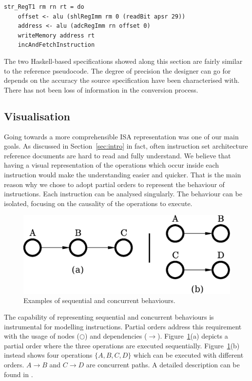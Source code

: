 \documentclass[conference]{IEEEtran}
\begin{document}
\begin{lstlisting}[caption=STR (register) instruction - Farfalle specification,
frame=single, label=lis:strH]
str_RegT1 rm rn rt = do
    offset <- alu (shlRegImm rm 0 (readBit apsr 29))
    address <- alu (adcRegImm rn offset 0)
    writeMemory address rt
    incAndFetchInstruction
\end{lstlisting}

The two Haskell-based specifications showed along this section are fairly similar to the
reference pseudocode. The degree of precision the designer can go for depends on the accuracy
the source specification have been characterised with. There has not been loss of
information in the conversion process.

\subsection{Visualisation}
\label{sec:read}
Going towards a more comprehensible ISA representation was one of our main goals. As discussed in
Section~\ref{sec:intro} in fact, often instruction set architecture reference documents are hard to
read and fully understand. We believe that having a visual representation of the operations
which occur inside each instruction would make the understanding easier and quicker. That is
the main reason why we chose to adopt partial orders to represent the behaviour of
instructions. Each instruction can be analysed singularly. The behaviour can be isolated,
focusing on the causality of the operations to execute.

\begin{figure}[ht!]
\begin{center}
	\includegraphics[scale=0.5]{IMG/pos.eps}
	\caption{Examples of sequential and concurrent behaviours.}
	\label{fig:pos}
\end{center}
\end{figure}

The capability of representing sequential and concurrent behaviours is instrumental for
modelling instructions. Partial orders address this requirement with the usage of nodes
($\bigcirc$) and dependencies ($\rightarrow$). Figure~\ref{fig:pos}(a) depicts a partial order
where the three operations are executed sequentially. Figure~\ref{fig:pos}(b) instead shows
four operations $\lbrace A,B,C,D \rbrace$ which can be executed with different orders. 
$A \rightarrow B$ and $C \rightarrow D$ are concurrent paths. A detailed
description can be found in \cite{andreyPhd}.
\end{document}
